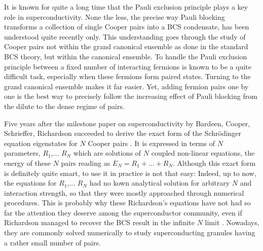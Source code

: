 \documentclass[aps,prb,superscriptaddress,twocolumn]{revtex4}
\begin{document}







It is known for quite a long time that the Pauli exclusion principle
plays a key role in superconductivity. None the less, the
precise way Pauli blocking transforms a collection of single Cooper pairs into a BCS
condensate, has been understood quite recently only. This understanding goes through
the study of Cooper pairs not within the grand canonical ensemble as done in the
standard BCS theory, but within the canonical ensemble. To handle the
Pauli exclusion principle between a fixed number of interacting fermions is known 
to be a quite difficult task, especially when these fermions form paired states. 
Turning to the grand canonical ensemble makes it far easier. Yet, adding fermion pairs one by
one is the best way to precisely follow the increasing effect of Pauli
blocking from the dilute to the dense regime of pairs.

Five years after the milestone paper on superconductivity by Bardeen,
Cooper, Schrieffer\cite{BCS}, Richardson succeeded to derive 
the exact form of the Schr\"{o}dinger equation eigenstates for $N$ Cooper pairs%
\cite{Richardson1,Richardson2}. It is expressed in terms
of $N$ parameters, $R_{1}$,... $R_{N}$ which are solutions of $N$ coupled
non-linear equations, the energy of these $N$ pairs reading as $E
_{N}=R_{1}+...+R_{N}$. Although this exact form is definitely quite smart, to
use it in practice is not that easy: Indeed, up to now, the equations for $R_{1}$,... $R_{N}$ had no
kown analytical solution for arbitrary $N$ and interaction strength, so that they were mostly approached through
numerical procedures\cite{Duk,delft}. This is probably why these Richardson's equations have not had so far the
attention they deserve among the superconductor community, even if Richardson managed to recover the 
BCS result in the infinite $N$ limit \cite{Richardson3}. Nowadays, they
are commonly solved numerically to study superconducting granules having a rather small number of pairs\cite{Duk}.
\end{document}
